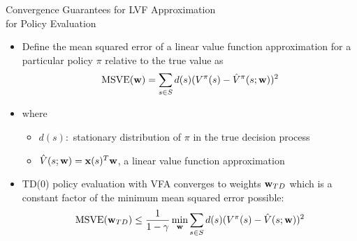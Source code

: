 \documentclass[aspectratio=169]{../latex_main/tntbeamer}  %
\begin{document}
\begin{frame}[c]{Convergence Guarantees for LVF
		Approximation\\ for Policy Evaluation}
	
\begin{itemize}
	\item Define the mean squared error of a linear value function
	approximation for a particular policy $\pi$ relative to the true value as
	$$\text{MSVE}(\mathbf{w}) = \sum_{s\in S} d(s) (V^\pi(s) - \hat{V}^\pi (s;\mathbf{w}))^2$$
	\item where
	\begin{itemize}
		\item $d(s):$ stationary distribution of $\pi$ in the true decision process
		\item $\hat{V}(s;\mathbf{w}) = \mathbf{x}(s)^T \mathbf{w}$, a linear value function approximation
	\end{itemize}
	\item TD(0) policy evaluation with VFA converges to weights $\mathbf{w}_{TD}$ which is a constant factor of the minimum mean squared error possible:
	$$\text{MSVE}(\mathbf{w}_{TD}) \leq \frac{1}{1-\gamma} \min_{\mathbf{w}}\sum_{s\in S} d(s) (V^\pi(s) - \hat{V}(s;\mathbf{w}))^2$$
\end{itemize}

	
\end{frame}
\end{document}
